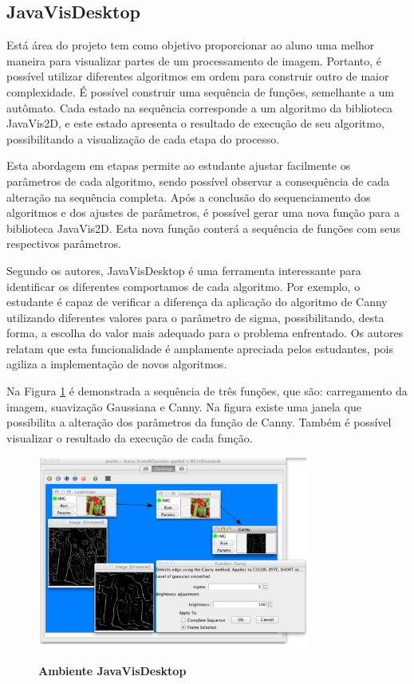 \documentclass[
	12pt,				%
	oneside,			%
	a4paper,			%
	english,			%
	french,				%
	spanish,			%
	brazil,				%
	]{abntex2}
\begin{document}
\subsection{JavaVisDesktop}

Está área do projeto tem como objetivo proporcionar ao aluno uma melhor maneira para visualizar partes de um processamento de imagem. Portanto, é possível utilizar diferentes algoritmos em ordem para construir outro de maior complexidade. É possível construir uma sequência de funções, semelhante a um autômato. Cada estado na sequência corresponde a um algoritmo da biblioteca JavaVis2D, e este estado apresenta o resultado de execução de seu algoritmo, possibilitando a visualização de cada etapa do processo.

Esta abordagem em etapas permite ao estudante ajustar facilmente os parâmetros de cada algoritmo, sendo possível observar a consequência de cada alteração na sequência completa. Após a conclusão do sequenciamento dos algoritmos e dos ajustes de parâmetros, é possível gerar uma nova função para a biblioteca JavaVis2D. Esta nova função conterá a sequência de funções com seus respectivos parâmetros.

Segundo os autores, JavaVisDesktop é uma ferramenta interessante para identificar os diferentes comportamos de cada algoritmo. Por exemplo, o estudante é capaz de verificar a diferença da aplicação do algoritmo de Canny utilizando diferentes valores para o parâmetro de sigma, possibilitando, desta forma, a escolha do valor mais adequado para o problema enfrentado. Os autores relatam que esta funcionalidade é amplamente apreciada pelos estudantes, pois agiliza a implementação de novos algoritmos.

Na Figura \ref{fig:javavis_desktop} é demonstrada a sequência de três funções, que são: carregamento da imagem, suavização Gaussiana e Canny. Na figura existe uma janela que possibilita a alteração dos parâmetros da função de Canny. Também é possível visualizar o resultado da execução de cada função.

\begin{figure}[ht]
\centering
\caption{\textbf{Ambiente JavaVisDesktop}}
\includegraphics[width=0.8\textwidth]{imagens/javavis_desktop.png}
\label{fig:javavis_desktop}
\end{figure}
\end{document}
